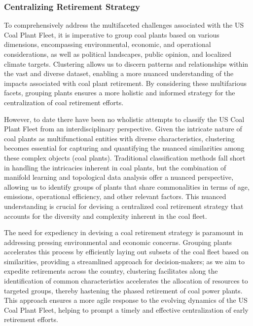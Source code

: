 \subsubsection*{Centralizing Retirement Strategy}


To comprehensively address the multifaceted challenges associated with the US Coal Plant Fleet, it is imperative to group coal plants based on various dimensions, 
encompassing environmental, economic, and operational considerations, as well as political landscapes, public opinion, and localized climate targets. Clustering allows us to discern patterns and relationships within the vast and diverse dataset, 
enabling a more nuanced understanding of the impacts associated with coal plant retirement. By considering these multifarious facets, grouping plants ensures a more 
holistic and informed strategy for the centralization of coal retirement efforts.

However, to date there have been no wholistic attempts to classify the US Coal Plant Fleet from an interdisciplinary perspective. Given the intricate nature of coal 
plants as multifunctional entities with diverse characteristics, clustering becomes essential for capturing and quantifying the nuanced similarities among these 
complex objects (coal plants). Traditional classification methods fall short in handling the intricacies inherent in coal plants, but the combination of manifold learning and topological data analysis offer 
a nuanced perspective, allowing us to identify groups of plants that share commonalities in terms of age, emissions, operational efficiency, and other relevant factors. 
This nuanced understanding is crucial for devising a centralized coal retirement strategy that accounts for the diversity and complexity inherent in the coal fleet.

The need for expediency in devising a coal retirement strategy is paramount in addressing pressing environmental and economic concerns. Grouping plants accelerates this 
process by efficiently laying out subsets of the coal fleet based on similarities, providing a streamlined approach for decision-makers; as we aim to expedite retirements across the country, 
clustering facilitates along the identification of common characteristics accelerates the allocation of resources to targeted groups, thereby hastening the phased retirement of 
coal power plants. This approach ensures a more agile response to the evolving dynamics of the US Coal Plant Fleet, helping to prompt a timely and effective centralization of early retirement efforts.

